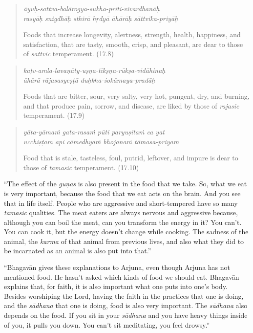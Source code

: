 \documentclass[12pt, twoside, openright]{memoir}
\begin{document}
\par
\begin{verse}
\textit{āyuḥ-sattva-balārogya-sukha-prīti-vivardhanāḥ} \\
\textit{rasyāḥ snigdhāḥ sthirā hṛdyā āhārāḥ sāttvika-priyāḥ}

\noindent Foods that increase longevity, alertness, strength, health, happiness, and satisfaction, that are tasty, smooth, crisp, and pleasant, are dear to those of \textit{sattvic} temperament. (17.8)
\end{verse}
\par



\par
\begin{verse}
\textit{kaṭv-amla-lavaṇāty-uṣṇa-tīkṣṇa-rūkṣa-vidāhinaḥ} \\
\textit{āhārā rājasasyeṣṭā duḥkha-śokāmaya-pradāḥ}

\noindent Foods that are bitter, sour, very salty, very hot, pungent, dry, and burning, and that produce pain, sorrow, and disease, are liked by those of \textit{rajasic} temperament. (17.9)
\end{verse}
\par



\par
\begin{verse}
\textit{yāta-yāmaṁ gata-rasaṁ pūti paryuṣitaṁ ca yat} \\
\textit{ucchiṣṭam api cāmedhyaṁ bhojanaṁ tāmasa-priyam}

\noindent Food that is stale, tasteless, foul, putrid, leftover, and impure is dear to those of \textit{tamasic} temperament. (17.10)
\end{verse}
\par


\enquote{The effect of the \textit{guṇas} is also present in the food that we take. So, what we eat is very important, because the food that we eat acts on the brain. And you see that in life itself. People who are aggressive and short-tempered have so many \textit{tamasic} qualities. The meat eaters are always nervous and aggressive because, although you can boil the meat, can you transform the energy in it? You can’t. You can cook it, but the energy doesn’t change while cooking. The sadness of the animal, the \textit{karma} of that animal from previous lives, and also what they did to be incarnated as an animal is also put into that.}

\enquote{Bhagavān gives these explanations to Arjuna, even though Arjuna has not mentioned food. He hasn’t asked which kinds of food we should eat. Bhagavān explains that, for faith, it is also important what one puts into one’s body. Besides worshiping the Lord, having the faith in the practices that one is doing, and the \textit{sādhana} that one is doing, food is also very important. The \textit{sādhana} also depends on the food. If you sit in your \textit{sādhana} and you have heavy things inside of you, it pulls you down. You can’t sit meditating, you feel drowsy.}
\end{document}
